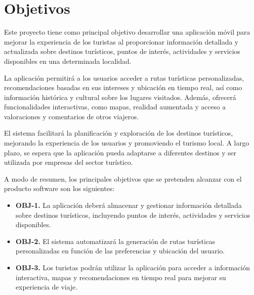 \section{Objetivos}

Este proyecto tiene como principal objetivo desarrollar una aplicación móvil
para mejorar la experiencia de los turistas al proporcionar información
detallada y actualizada sobre destinos turísticos, puntos de interés,
actividades y servicios disponibles en una determinada localidad.

La aplicación permitirá a los usuarios acceder a rutas turísticas
personalizadas, recomendaciones basadas en sus intereses y ubicación en tiempo
real, así como información histórica y cultural sobre los lugares visitados.
Además, ofrecerá funcionalidades interactivas, como mapas, realidad aumentada y
acceso a valoraciones y comentarios de otros viajeros.

El sistema facilitará la planificación y exploración de los destinos turísticos,
mejorando la experiencia de los usuarios y promoviendo el turismo local. A
largo plazo, se espera que la aplicación pueda adaptarse a diferentes destinos y
ser utilizada por empresas del sector turístico.

A modo de resumen, los principales objetivos que se pretenden alcanzar con el
producto software son los siguientes:

\begin{itemize} \item \textbf{OBJ-1.} La aplicación deberá almacenar y
gestionar información detallada sobre destinos turísticos, incluyendo puntos de
interés, actividades y servicios disponibles. \item \textbf{OBJ-2.} El sistema
automatizará la generación de rutas turísticas personalizadas en función de las
preferencias y ubicación del usuario. \item \textbf{OBJ-3.} Los turistas podrán
utilizar la aplicación para acceder a información interactiva, mapas y
recomendaciones en tiempo real para mejorar su experiencia de viaje.
\end{itemize}